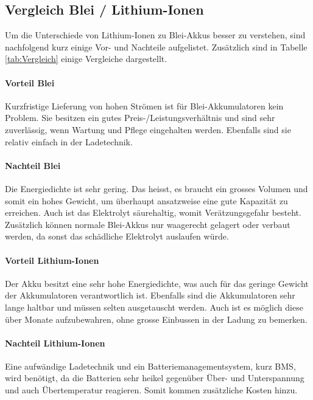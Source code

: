 \newpage

\subsection{Vergleich Blei / Lithium-Ionen} \label{kap:Vergleich_liion_pb}

Um die Unterschiede von Lithium-Ionen zu Blei-Akkus besser zu verstehen, sind nachfolgend kurz einige Vor- und Nachteile aufgelistet. Zusätzlich sind in Tabelle \ref{tab:Vergleich} einige Vergleiche dargestellt.

\paragraph{Vorteil Blei}

Kurzfristige Lieferung von hohen Strömen ist für Blei-Akkumulatoren kein Problem. Sie besitzen ein gutes Preis-/Leistungsverhältnis und sind sehr zuverlässig, wenn Wartung und Pflege eingehalten werden. Ebenfalls sind sie relativ einfach in der Ladetechnik.

\paragraph{Nachteil Blei}

Die Energiedichte ist sehr gering. Das heisst, es braucht ein grosses Volumen und somit ein hohes Gewicht, um überhaupt ansatzweise eine gute Kapazität zu erreichen. Auch ist das Elektrolyt säurehaltig, womit Verätzungsgefahr besteht. Zusätzlich können normale Blei-Akkus nur waagerecht gelagert oder verbaut werden, da sonst das schädliche Elektrolyt auslaufen würde.

\paragraph{Vorteil Lithium-Ionen}

Der Akku besitzt eine sehr hohe Energiedichte, was auch für das geringe Gewicht der Akkumulatoren verantwortlich ist. Ebenfalls sind die Akkumulatoren sehr lange haltbar und müssen selten ausgetauscht werden. Auch ist es möglich diese über Monate aufzubewahren, ohne grosse Einbussen in der Ladung zu bemerken.

\paragraph{Nachteil Lithium-Ionen}

Eine aufwändige Ladetechnik und ein Batteriemanagementsystem, kurz BMS, wird benötigt, da die Batterien sehr heikel gegenüber Über- und Unterspannung und auch Übertemperatur reagieren. Somit kommen zusätzliche Kosten hinzu.

